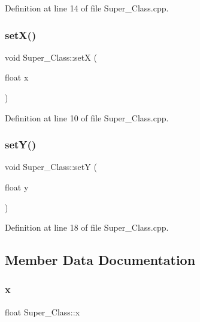 Definition at line 14 of file Super\+\_\+\+Class.\+cpp.

\hypertarget{class_super___class_a723decaf337e535db49844408911198e}{}\label{class_super___class_a723decaf337e535db49844408911198e} 
\subsubsection{\texorpdfstring{set\+X()}{setX()}}
{\footnotesize\ttfamily void Super\+\_\+\+Class\+::setX (\begin{DoxyParamCaption}\item[{float}]{x }\end{DoxyParamCaption})}



Definition at line 10 of file Super\+\_\+\+Class.\+cpp.

\hypertarget{class_super___class_a8f67cb1646ea619e9fc69b9c812fec45}{}\label{class_super___class_a8f67cb1646ea619e9fc69b9c812fec45} 
\subsubsection{\texorpdfstring{set\+Y()}{setY()}}
{\footnotesize\ttfamily void Super\+\_\+\+Class\+::setY (\begin{DoxyParamCaption}\item[{float}]{y }\end{DoxyParamCaption})}



Definition at line 18 of file Super\+\_\+\+Class.\+cpp.



\subsection{Member Data Documentation}
\hypertarget{class_super___class_a6c644a695141db808e5f1227537e3074}{}\label{class_super___class_a6c644a695141db808e5f1227537e3074} 
\subsubsection{\texorpdfstring{x}{x}}
{\footnotesize\ttfamily float Super\+\_\+\+Class\+::x\hspace{0.3cm}{\ttfamily [protected]}}



